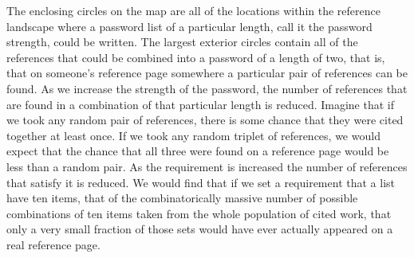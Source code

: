 \documentclass[]{book}
\theoremstyle{definition}
\theoremstyle{definition}
\theoremstyle{definition}
\theoremstyle{remark}
\begin{document}
The enclosing circles on the map are all of the locations within the
reference landscape where a password list of a particular length, call
it the password strength, could be written. The largest exterior circles
contain all of the references that could be combined into a password of
a length of two, that is, that on someone's reference page somewhere a
particular pair of references can be found. As we increase the strength
of the password, the number of references that are found in a
combination of that particular length is reduced. Imagine that if we
took any random pair of references, there is some chance that they were
cited together at least once. If we took any random triplet of
references, we would expect that the chance that all three were found on
a reference page would be less than a random pair. As the requirement is
increased the number of references that satisfy it is reduced. We would
find that if we set a requirement that a list have ten items, that of
the combinatorically massive number of possible combinations of ten
items taken from the whole population of cited work, that only a very
small fraction of those sets would have ever actually appeared on a real
reference page.
\end{document}
